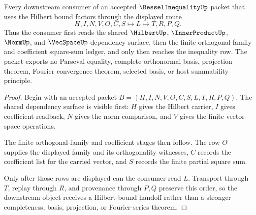 \begin{theorem}
\label{thm:bessel-inequality-hilbert-bound-handoff}
Every downstream consumer of an accepted $\BesselInequalityUp$ packet that uses the Hilbert bound factors through the displayed route
$$
H,I,N,V,O,C,S \longmapsto L \longmapsto T,R,P,Q .
$$
Thus the consumer first reads the shared $\HilbertUp$, $\InnerProductUp$, $\NormUp$, and $\VecSpaceUp$ dependency surface, then the finite orthogonal family and coefficient square-sum ledger, and only then reaches the inequality row. The packet exports no Parseval equality, complete orthonormal basis, projection theorem, Fourier convergence theorem, selected basis, or host summability principle.
\end{theorem}
\begin{proof}
Begin with an accepted packet $B=(H,I,N,V,O,C,S,L,T,R,P,Q)$. The shared dependency surface is visible first: $H$ gives the Hilbert carrier, $I$ gives coefficient readback, $N$ gives the norm comparison, and $V$ gives the finite vector-space operations.

The finite orthogonal-family and coefficient stages then follow. The row $O$ supplies the displayed family and its orthogonality witnesses, $C$ records the coefficient list for the carried vector, and $S$ records the finite partial square sum.

Only after those rows are displayed can the consumer read $L$. Transport through $T$, replay through $R$, and provenance through $P,Q$ preserve this order, so the downstream object receives a Hilbert-bound handoff rather than a stronger completeness, basis, projection, or Fourier-series theorem.
\end{proof}


\begin{closurestatus}{\BesselInequalityUp}
  \theoryclosure{\seedClosure}
  \formalstatus{\unformalizedV}
\end{closurestatus}
